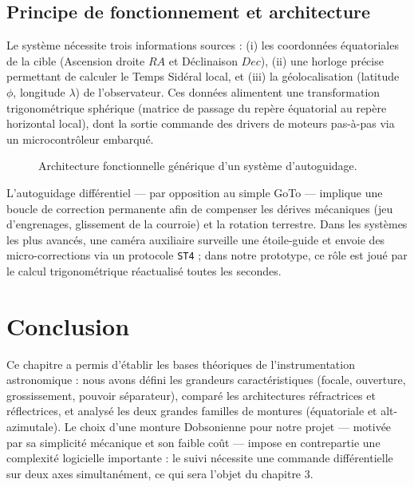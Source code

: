 \documentclass[12pt,a4paper]{report}
\begin{document}
\subsection{Principe de fonctionnement et architecture}
Le système nécessite trois informations sources : (i) les coordonnées équatoriales de la cible (Ascension droite $RA$ et Déclinaison $Dec$), (ii) une horloge précise permettant de calculer le Temps Sidéral local, et (iii) la géolocalisation (latitude $\phi$, longitude $\lambda$) de l'observateur. Ces données alimentent une transformation trigonométrique sphérique (matrice de passage du repère équatorial au repère horizontal local), dont la sortie commande des drivers de moteurs pas-à-pas via un microcontrôleur embarqué.

\begin{figure}[H]
    \centering
    \caption{Architecture fonctionnelle générique d'un système d'autoguidage.}
    \label{fig:archi_general}
\end{figure}

L'autoguidage différentiel — par opposition au simple GoTo — implique une boucle de correction permanente afin de compenser les dérives mécaniques (jeu d'engrenages, glissement de la courroie) et la rotation terrestre. Dans les systèmes les plus avancés, une caméra auxiliaire surveille une étoile-guide et envoie des micro-corrections via un protocole \texttt{ST4} ; dans notre prototype, ce rôle est joué par le calcul trigonométrique réactualisé toutes les secondes.

\section{Conclusion }
Ce chapitre a permis d'établir les bases théoriques de l'instrumentation astronomique : nous avons défini les grandeurs caractéristiques (focale, ouverture, grossissement, pouvoir séparateur), comparé les architectures réfractrices et réflectrices, et analysé les deux grandes familles de montures (équatoriale et alt-azimutale). Le choix d'une monture Dobsonienne pour notre projet — motivée par sa simplicité mécanique et son faible coût — impose en contrepartie une complexité logicielle importante : le suivi nécessite une commande différentielle sur deux axes simultanément, ce qui sera l'objet du chapitre 3.
\end{document}
